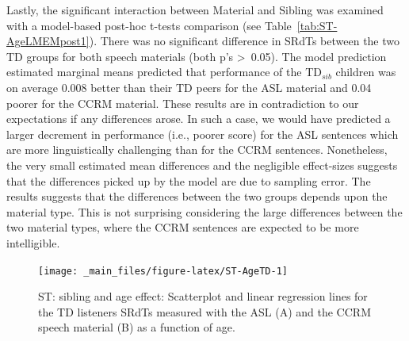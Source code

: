 \documentclass[a4paper, twoside]{templates/ociamthesis}
\begin{document}
Lastly, the significant interaction between Material and Sibling was examined with a model-based post-hoc t-tests comparison (see Table~\ref{tab:ST-AgeLMEMpost1}). There was no significant difference in SRdTs between the two TD groups for both speech materials (both p's \textgreater~0.05). The model prediction estimated marginal means predicted that performance of the TD\(_{sib}\) children was on average 0.008 better than their TD peers for the ASL material and 0.04 poorer for the CCRM material. These results are in contradiction to our expectations if any differences arose. In such a case, we would have predicted a larger decrement in performance (i.e., poorer score) for the ASL sentences which are more linguistically challenging than for the CCRM sentences. Nonetheless, the very small estimated mean differences and the negligible effect-sizes suggests that the differences picked up by the model are due to sampling error. The results suggests that the differences between the two groups depends upon the material type. This is not surprising considering the large differences between the two material types, where the CCRM sentences are expected to be more intelligible.\\



\begin{table}

\caption{\label{tab:ST-AgeLMEMpost1}ST: Age-effect: post-hoc paired-comparison t-tests for Material (ASL/CCRM) x Sibling (TD/TD\(_{sib}\)) interaction. The test was performed on the fitted LMEM model and included adjusted least-squared-mean for the random intercepts (subjects) using the emmeans package \autocite{emmeansPackageR}.}
\centering
{}
\end{table}

\begin{figure}[h]

{\centering \texttt{[image: \_main\_files/figure-latex/ST-AgeTD-1]} 

}

\caption{ST: sibling and age effect: Scatterplot and linear regression lines for the TD listeners SRdTs measured with the ASL (A) and the CCRM speech material (B) as a function of age.}\label{fig:ST-AgeTD}
\end{figure}
\end{document}
